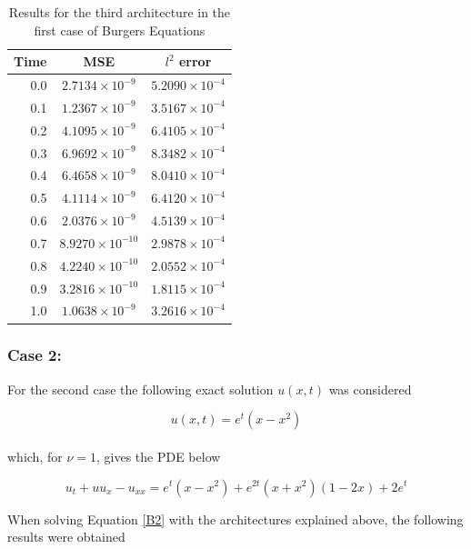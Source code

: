 \documentclass[12pt,letterpaper]{article}
\begin{document}
    \begin{table}[H]
      \begin{center}
      \begin{tabular}{ r | c  c }
      \textbf{Time} & \textbf{MSE} & \textbf{$l^2$ error} \\ \hline
      0.0 & $ 2.7134\times 10^{-9}$ & $ 5.2090\times 10^{-4} $ \\
      0.1 & $ 1.2367\times 10^{-9}$ & $ 3.5167\times 10^{-4} $ \\
      0.2 & $ 4.1095\times 10^{-9}$ & $ 6.4105\times 10^{-4} $ \\
      0.3 & $ 6.9692\times 10^{-9}$ & $ 8.3482\times 10^{-4} $ \\
      0.4 & $ 6.4658\times 10^{-9}$ & $ 8.0410\times 10^{-4} $ \\
      0.5 & $ 4.1114\times 10^{-9}$ & $ 6.4120\times 10^{-4} $ \\
      0.6 & $ 2.0376\times 10^{-9}$ & $ 4.5139\times 10^{-4} $ \\
      0.7 & $ 8.9270\times 10^{-10}$ & $ 2.9878\times 10^{-4} $ \\
      0.8 & $ 4.2240\times 10^{-10}$ & $ 2.0552\times 10^{-4} $ \\
      0.9 & $ 3.2816\times 10^{-10}$ & $ 1.8115\times 10^{-4} $ \\
      1.0 & $ 1.0638\times 10^{-9}$ & $ 3.2616\times 10^{-4} $ \\
      \end{tabular}
      \caption{Results for the third architecture in the first case of Burgers Equations}
      \label{tab:B13}
      \end{center}
      \end{table}  
\subsubsection*{Case 2:}

For the second case the following exact solution $u(x,t)$ was considered

$$u(x,t) = e^{t}(x-x^2)$$\\

which, for $\nu=1$, gives the PDE below

\begin{equation}
  \label{B2}
  u_t + u u_x - u_{xx} = e^t (x-x^2) + e^{2t} (x+x^2) (1-2x) + 2e^t
\end{equation}

When solving Equation \ref{B2} with the architectures explained above, the following results were obtained
\end{document}
